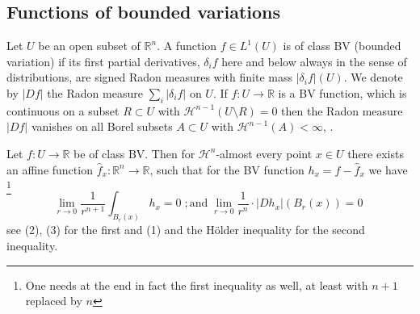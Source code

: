 \documentclass[12pt,leqno]{amsart}
\numberwithin{equation}{section}
\theoremstyle{definition}
\theoremstyle{remark}
\newtheorem{rem}[thm]{Remark}
\newcommand{\R}{\mathbb{R}}
\def\co{\colon\thinspace}
\begin{document}

\subsection{Functions of bounded variations}
Let $U$ be an open subset of $\R^n$. A function $f\in L^1 (U)$ is of class  BV (bounded variation) if its first partial derivatives, $\delta _i f$ here and below always in the sense of distributions, are signed Radon measures with finite mass $|\delta _i f |(U)$. We denote by $|Df|$ the Radon measure $\sum_i |\delta _i f|$ on $U$.  If $f:U\to \R$ is a BV function, which is continuous on a subset $R \subset U$ with $\mathcal H^{n-1} (U\setminus R)=0$ then the Radon measure $|Df|$ vanishes on all Borel subsets $A\subset U$ with $\mathcal H^{n-1} (A)<\infty$, \cite{Goffmann}.

Let $f:U\to \R$ be of class BV.  Then  for $\mathcal H^n$-almost every point
$x\in U$ there exists an affine  function $\hat f _x:\R^n\to \R$, such that for the BV function $h_x=f-\hat f_x$  we have \footnote{\color{blue} One needs at the end  in fact the first inequality as well, at least with $n+1$ replaced by $n$}
\begin{equation}\label{DC-ae-diff}
\lim_{r\to 0}\frac 1 {r^{n+1}}  \int _{B_r(x)} h_x =0 \; ; \text{and} \;     \lim _{r\to 0}  \frac 1 {r^n} \cdot   |Dh_x| (B_r (x)) =0 \;
\end{equation}
see \cite[ Theorem 6.1]{Evans} (2), (3) for the first and (1) and the H\"older inequality for the second inequality.

\end{document}
